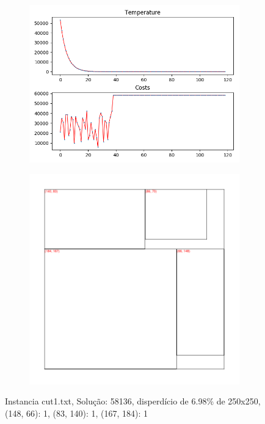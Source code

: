 \begin{figure}
\centering
\begin{subfigure}{.5\textwidth}
  \centering
  \includegraphics[width=1\linewidth]{results/cut1/1/plot}
  \label{fig:sub1}
\end{subfigure}%
\begin{subfigure}{.5\textwidth}
  \centering
  \includegraphics[width=1\linewidth]{results/cut1/1/cut}
  \label{fig:sub2}
\end{subfigure}
\caption{Instancia cut1.txt, Solução: 58136, disperdício de 6.98\% de 250x250, {(148, 66): 1, (83, 140): 1, (167, 184): 1}}
\label{fig:test}
\end{figure}


